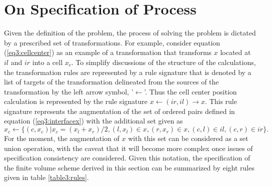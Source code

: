 \documentclass[10pt,epsf]{book}
\begin{document}
\section{On Specification of Process}

Given the definition of the problem, the process of solving the
problem is dictated by a prescribed set of transformations.  For
example, consider equation (\ref{eq3:cellcenter}) as an example of a
transformation that transforms $x$ located at $il$ and $ir$ into a
cell $x_c$.  To simplify discussions of the structure of the
calculations, the transformation rules are represented by a rule
signature that is denoted by a list of targets of the transformation
delineated from the sources of the transformation by the left arrow
symbol, '$\leftarrow$'.  Thus the cell center position calculation is
represented by the rule signature $x \leftarrow (ir,il)\rightarrow x$.
This rule signature represents the augmentation of the set of ordered
pairs defined in equation (\ref{eq3:interfacex}) with the additional
set given as
\begin{equation}
x_c \leftarrow\lbrace (c, x_c) |  x_c = (x_l + x_r)/2,
                               (l,x_l) \in x, (r,x_r) \in x, 
                               (c,l) \in il, (c,r) \in ir \rbrace.
\end{equation}
For the moment, the augmentation of $x$ with this set can be
considered as a set union operation, with the caveat that it will
become more complex once issues of specification consistency are
considered.  Given this notation, the specification of the finite
volume scheme derived in this section can be summarized by eight rules
given in table \ref{table3:rules}.
\end{document}
